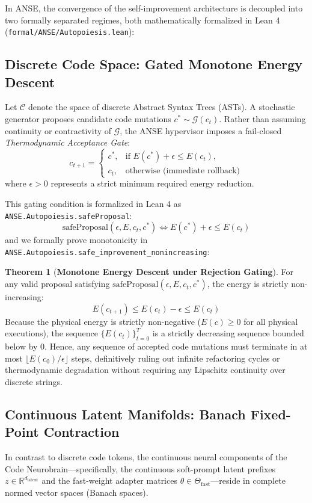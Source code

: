 \documentclass[10pt,journal,compsoc,twocolumn]{IEEEtran}
\theoremstyle{definition}
\newtheorem{theorem}{Theorem}
\begin{document}
In ANSE, the convergence of the self-improvement architecture is decoupled into two formally separated regimes, both mathematically formalized in Lean 4 (\texttt{formal/ANSE/Autopoiesis.lean}):

\subsection{Discrete Code Space: Gated Monotone Energy Descent}
Let $\mathcal{C}$ denote the space of discrete Abstract Syntax Trees (ASTs). A stochastic generator proposes candidate code mutations $c^* \sim \mathcal{G}(c_t)$. Rather than assuming continuity or contractivity of $\mathcal{G}$, the ANSE hypervisor imposes a fail-closed \textit{Thermodynamic Acceptance Gate}:
\begin{equation}
c_{t+1} = 
\begin{cases}
c^*, & \text{if } E(c^*) + \epsilon \le E(c_t), \\
c_t, & \text{otherwise (immediate rollback)}
\end{cases}
\label{eq:rejection_gate}
\end{equation}
where $\epsilon > 0$ represents a strict minimum required energy reduction.

This gating condition is formalized in Lean 4 as \texttt{ANSE.Autopoiesis.safeProposal}:
\begin{equation}
\text{safeProposal}(\epsilon, E, c_t, c^*) \iff E(c^*) + \epsilon \le E(c_t)
\end{equation}
and we formally prove monotonicity in \texttt{ANSE.Autopoiesis.safe\_improvement\_nonincreasing}:
\begin{theorem}[\textbf{Monotone Energy Descent under Rejection Gating}]
For any valid proposal satisfying $\text{safeProposal}(\epsilon, E, c_t, c^*)$, the energy is strictly non-increasing:
\begin{equation}
E(c_{t+1}) \le E(c_t) - \epsilon \le E(c_t)
\end{equation}
Because the physical energy is strictly non-negative ($E(c) \ge 0$ for all physical executions), the sequence $\{E(c_t)\}_{t=0}^T$ is a strictly decreasing sequence bounded below by $0$. Hence, any sequence of accepted code mutations must terminate in at most $\lfloor E(c_0) / \epsilon \rfloor$ steps, definitively ruling out infinite refactoring cycles or thermodynamic degradation without requiring any Lipschitz continuity over discrete strings.
\end{theorem}

\subsection{Continuous Latent Manifolds: Banach Fixed-Point Contraction}
In contrast to discrete code tokens, the continuous neural components of the Code Neurobrain—specifically, the continuous soft-prompt latent prefixes $z \in \mathbb{R}^{d_{\text{latent}}}$ and the fast-weight adapter matrices $\theta \in \Theta_{\text{fast}}$—reside in complete normed vector spaces (Banach spaces).
\end{document}
